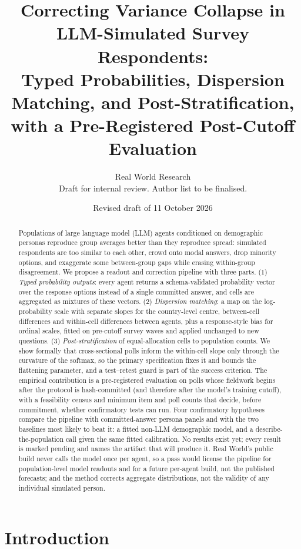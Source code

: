 \documentclass[11pt]{article}
\title{Correcting Variance Collapse in LLM-Simulated Survey Respondents:\\
Typed Probabilities, Dispersion Matching, and Post-Stratification,\\
with a Pre-Registered Post-Cutoff Evaluation}
\author{Real World Research\\
\small Draft for internal review. Author list to be finalised.}
\date{Revised draft of 11 October 2026}
\begin{document}
\maketitle

\begin{abstract}
Populations of large language model (LLM) agents conditioned on demographic personas reproduce group averages better than they reproduce spread: simulated respondents are too similar to each other, crowd onto modal answers, drop minority options, and exaggerate some between-group gaps while erasing within-group disagreement. We propose a readout and correction pipeline with three parts. (1) \emph{Typed probability outputs}: every agent returns a schema-validated probability vector over the response options instead of a single committed answer, and cells are aggregated as mixtures of these vectors. (2) \emph{Dispersion matching}: a map on the log-probability scale with separate slopes for the country-level centre, between-cell differences and within-cell differences between agents, plus a response-style bias for ordinal scales, fitted on pre-cutoff survey waves and applied unchanged to new questions. (3) \emph{Post-stratification} of equal-allocation cells to population counts. We show formally that cross-sectional polls inform the within-cell slope only through the curvature of the softmax, so the primary specification fixes it and bounds the flattening parameter, and a test--retest guard is part of the success criterion. The empirical contribution is a pre-registered evaluation on polls whose fieldwork begins after the protocol is hash-committed (and therefore after the model's training cutoff), with a feasibility census and minimum item and poll counts that decide, before commitment, whether confirmatory tests can run. Four confirmatory hypotheses compare the pipeline with committed-answer persona panels and with the two baselines most likely to beat it: a fitted non-LLM demographic model, and a describe-the-population call given the same fitted calibration. No results exist yet; every result is marked pending and names the artifact that will produce it. Real World's public build never calls the model once per agent, so a pass would license the pipeline for population-level model readouts and for a future per-agent build, not the published forecasts; and the method corrects aggregate distributions, not the validity of any individual simulated person.
\end{abstract}

\section{Introduction}
\end{document}

